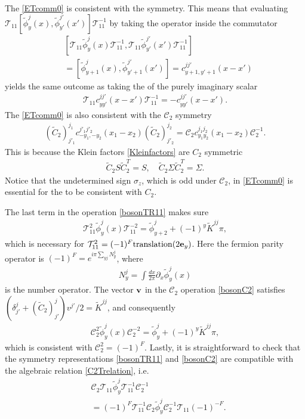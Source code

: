 The \ETCR \eqref{ETcomm0} is consistent with the \AFTR symmetry. This means that evaluating $\mathcal{T}_{11}\left[\tilde\phi_y^j(x),\tilde\phi_{y'}^{j'}(x')\right]\mathcal{T}_{11}^{-1}$ by taking the \AFTR operator inside the commutator \begin{align}&\left[\mathcal{T}_{11}\tilde\phi_y^j(x)\mathcal{T}_{11}^{-1},\mathcal{T}_{11}\tilde\phi_{y'}^{j'}(x')\mathcal{T}_{11}^{-1}\right]\nonumber\\&=\left[\tilde\phi_{y+1}^j(x),\tilde\phi_{y'+1}^{j'}(x')\right]=c^{jj'}_{y+1,y'+1}(x-x')\end{align} yields the same outcome as taking the \TR of the purely imaginary scalar \begin{align}\mathcal{T}_{11}c^{jj'}_{yy'}(x-x')\mathcal{T}_{11}^{-1}=-c^{jj'}_{yy'}(x-x').\end{align} The \ETCR \eqref{ETcomm0} is also consistent with the $\mathcal{C}_2$ symmetry \begin{align}(\tilde{C}_2)^{j_1}_{j'_1}c^{j'_1j'_2}_{-y_1,-y_2}(x_1-x_2)(\tilde{C}_2)^{j_2}_{j'_2}=\mathcal{C}_2c^{j_1j_2}_{y_1y_2}(x_1-x_2)\mathcal{C}_2^{-1}.\label{ETcommC2consistent}\end{align} This is because the Klein factors \eqref{Kleinfactors} are $C_2$ symmetric \begin{align}\tilde{C}_2S\tilde{C}_2^T=S,\quad\tilde{C}_2\Sigma\tilde{C}_2^T=\Sigma.\end{align} Notice that the undetermined sign $\sigma_z$, which is odd under $\mathcal{C}_2$, in \eqref{ETcomm0} is essential for the \ETCR to be consistent with $C_2$.

The last term in the \AFTR operation \eqref{bosonTR11} makes sure \begin{align}\mathcal{T}_{11}^2\tilde\phi_y^j(x)\mathcal{T}_{11}^{-2}=\tilde\phi_{y+2}^j+(-1)^y\tilde{K}^{jj}\pi,\end{align} which is necessary for $\mathcal{T}^2_{11}=(-1)^F\mathrm{translation}(2{\bf e}_y)$. Here the fermion parity operator is $(-1)^F=e^{i\pi\sum_{yj}N_y^j}$, where \begin{align}N_y^j=\int\frac{dx}{2\pi}\partial_x\tilde\phi_y^j(x)\label{numop}\end{align} is the number operator. The vector ${\bf v}$ in the $\mathcal{C}_2$ operation \eqref{bosonC2} satisfies $(\delta^j_{j'}+(\tilde{C}_2)^j_{j'})v^{j'}/2=\tilde{K}^{jj}$, and consequently \begin{align}\mathcal{C}_{2}^2\tilde\phi_y^j(x)\mathcal{C}_{2}^{-2}=\tilde\phi_y^j+(-1)^y\tilde{K}^{jj}\pi,\end{align} which is consistent with $\mathcal{C}_2^2=(-1)^F$. Lastly, it is straightforward to check that the symmetry representations \eqref{bosonTR11} and \eqref{bosonC2} are compatible with the algebraic relation \eqref{C2Trelation}, i.e. \begin{align}&\mathcal{C}_2\mathcal{T}_{11}\tilde\phi^j_y\mathcal{T}_{11}^{-1}\mathcal{C}_2^{-1}\\&=(-1)^F\mathcal{T}_{11}^{-1}\mathcal{C}_2\tilde\phi^j_y\mathcal{C}_2^{-1}\mathcal{T}_{11}(-1)^{-F}.\nonumber\end{align}

